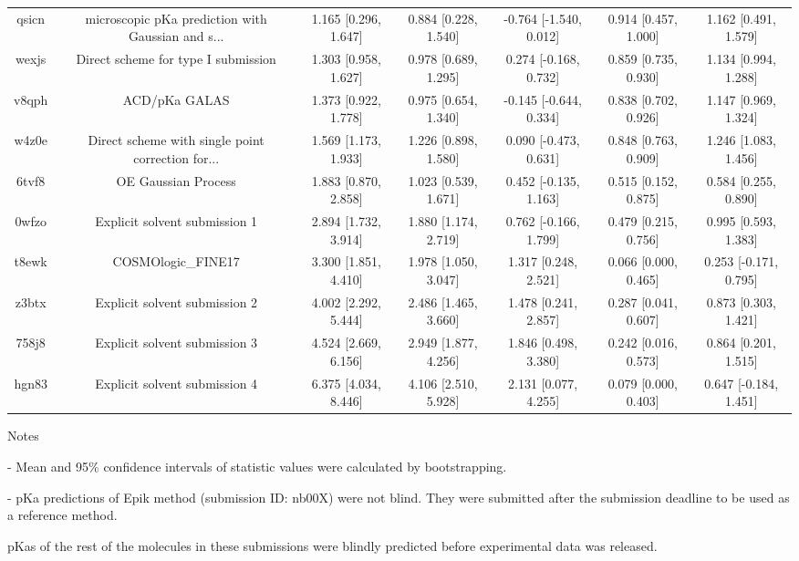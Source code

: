 \documentclass{article}
\begin{document}
\begin{center}
\begin{longtable}{|ccccccc|}
 qsicn &  microscopic pKa prediction with Gaussian and s... &  1.165 [0.296, 1.647] &  0.884 [0.228, 1.540] &  -0.764 [-1.540, 0.012] &  0.914 [0.457, 1.000] &   1.162 [0.491, 1.579] \\
 wexjs &                Direct scheme for type I submission &  1.303 [0.958, 1.627] &  0.978 [0.689, 1.295] &   0.274 [-0.168, 0.732] &  0.859 [0.735, 0.930] &   1.134 [0.994, 1.288] \\
 v8qph &                                      ACD/pKa GALAS &  1.373 [0.922, 1.778] &  0.975 [0.654, 1.340] &  -0.145 [-0.644, 0.334] &  0.838 [0.702, 0.926] &   1.147 [0.969, 1.324] \\
 w4z0e &  Direct scheme with single point correction for... &  1.569 [1.173, 1.933] &  1.226 [0.898, 1.580] &   0.090 [-0.473, 0.631] &  0.848 [0.763, 0.909] &   1.246 [1.083, 1.456] \\
 6tvf8 &                                OE Gaussian Process &  1.883 [0.870, 2.858] &  1.023 [0.539, 1.671] &   0.452 [-0.135, 1.163] &  0.515 [0.152, 0.875] &   0.584 [0.255, 0.890] \\
 0wfzo &                      Explicit solvent submission 1 &  2.894 [1.732, 3.914] &  1.880 [1.174, 2.719] &   0.762 [-0.166, 1.799] &  0.479 [0.215, 0.756] &   0.995 [0.593, 1.383] \\
 t8ewk &                                 COSMOlogic\_FINE17 &  3.300 [1.851, 4.410] &  1.978 [1.050, 3.047] &    1.317 [0.248, 2.521] &  0.066 [0.000, 0.465] &  0.253 [-0.171, 0.795] \\
 z3btx &                      Explicit solvent submission 2 &  4.002 [2.292, 5.444] &  2.486 [1.465, 3.660] &    1.478 [0.241, 2.857] &  0.287 [0.041, 0.607] &   0.873 [0.303, 1.421] \\
 758j8 &                      Explicit solvent submission 3 &  4.524 [2.669, 6.156] &  2.949 [1.877, 4.256] &    1.846 [0.498, 3.380] &  0.242 [0.016, 0.573] &   0.864 [0.201, 1.515] \\
 hgn83 &                      Explicit solvent submission 4 &  6.375 [4.034, 8.446] &  4.106 [2.510, 5.928] &    2.131 [0.077, 4.255] &  0.079 [0.000, 0.403] &  0.647 [-0.184, 1.451] \\
\end{longtable}
\end{center}

Notes

- Mean and 95\% confidence intervals of statistic values were calculated by bootstrapping.

- pKa predictions of Epik method (submission ID: nb00X) were not blind. They were submitted after the submission deadline to be used as a reference method.

pKas of the rest of the molecules in these submissions were blindly predicted before experimental data was released.
\end{document}
